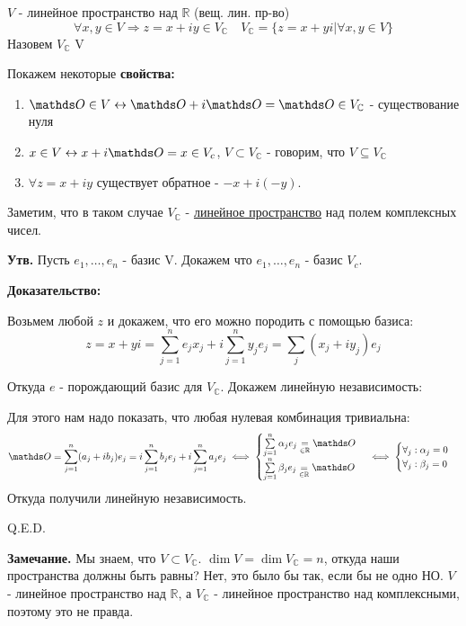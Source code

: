  $V$ - линейное пространство над $\mathbb{R}$ (вещ. лин. пр-во)
$$\forall x,y \in V \Rightarrow  z = x+iy \in V_{\mathbb{C}} \quad V_{\mathbb{C}} = \{ z = x+yi | \forall x,y \in V\}$$
Назовем $V_{\mathbb{C}}$  V

Покажем некоторые \textbf{свойства:}
\begin{enumerate}
    \item $\zero \in V \leftrightarrow \zero + i\zero = \zero \in V_{\mathbb{C}}$ - существование нуля 
    \item $x \in V \leftrightarrow x +i\zero = x \in V_c$, $V \subset V_{\mathbb{C}}$ - говорим, что $V\subseteq  V_{\mathbb{C}}$ 
    \item $\forall z = x + iy$ существует обратное - $-x+i(-y)$.
\end{enumerate}

Заметим, что в таком случае $V_\mathbb{C}$ -  \uline{линейное пространство} над полем комплексных чисел.


\textbf{Утв.} Пусть $e_1,\ldots,e_n$ - базис V. Докажем что $e_1,\ldots, e_n$ - базис $V_c$.

\textbf{Доказательство:}

Возьмем любой $z$ и докажем, что его можно породить с помощью базиса:
$$z = x+ yi = \sum\limits_{j=1}^n e_j x_j + i\sum\limits_{j=1}^ny_j e_j = \sum\limits_{j}(x_j+iy_j)e_j$$

Откуда $e$ - порождающий базис для $V_{\mathbb{C}}$. Докажем линейную независимость:

Для этого нам надо показать, что любая нулевая комбинация тривиальна:
$$\zero = \sum\limits_{j=1}^n(a_j+ib_j)e_j =i\sum\limits_{j=1}^nb_je_j + i\sum\limits_{j=1}^na_je_j \iff \begin{cases}
    \sum\limits_{j=1}^n \alpha_je_j\underset{\in \mathbb{R}} = \zero \\
     \sum\limits_{j=1}^n \beta_je_j\underset{\in \mathbb{R}} =\zero
\end{cases} \iff  \begin{cases}
    \forall_j : \alpha_j =0 \\
    \forall_j : \beta_j =0
\end{cases}$$ 
Откуда получили линейную независимость.

\hfill Q.E.D.

\textbf{Замечание.} Мы знаем, что $V \subset V_{\mathbb{C}}$. $\dim V = \dim V_{\mathbb{C}} = n$, откуда наши пространства должны быть равны? Нет, это было бы так, если бы не одно НО.  $V$ - линейное пространство над $\mathbb{R}$, а $V_{\mathbb{C}}$ - линейное пространство над комплексными, поэтому это не правда.

